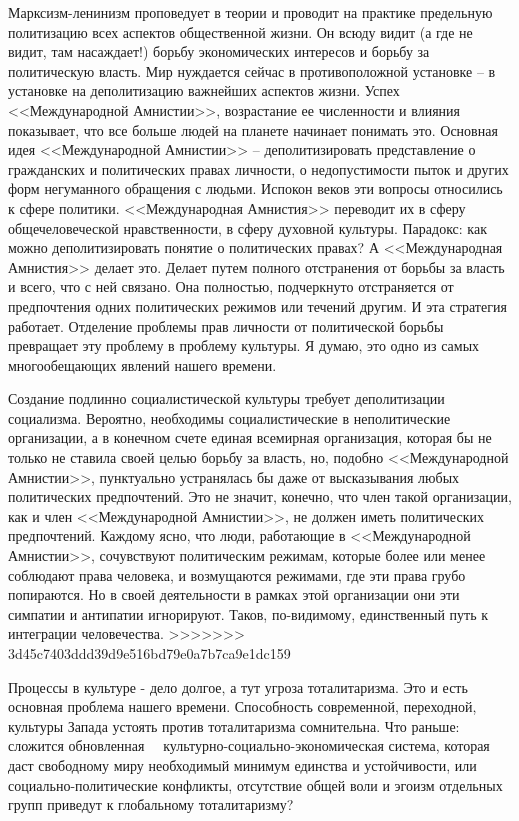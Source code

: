 \documentclass{book}
\begin{document}
{Марксизм-ленинизм проповедует в теории и проводит на практике предельную политизацию всех аспектов обществен­ной жизни. Он всюду видит (а где не видит, там насаждает!) борьбу экономических интересов и борьбу за политическую власть. Мир нуждается сейчас в противоположной установке -- в установке на деполитизацию  важнейших аспектов жизни. Успех <<Международной Амнистии>>, возрастание ее численно­сти и влияния показывает, что все больше людей на планете начи­нает понимать это. Основная идея <<Международной Амнистии>> -- деполитизировать представление о гражданских и поли­тических правах личности, о недопустимости пыток и других форм негуманного обращения с людьми. Испокон веков эти вопросы относились к сфере политики. <<Международная Амни­стия>> переводит их в сферу общечеловеческой нравственности, в сферу духовной культуры. Парадокс: как можно деполитизи­ровать понятие о политических  правах? А <<Международная Амнистия>> делает это. Делает путем полного отстранения от борьбы за власть  и всего, что с ней связано. 
Она полностью, подчеркнуто отстраняется от предпочтения одних политиче­ских режимов или течений другим. И эта стратегия работает. Отделение проблемы прав личности от политической борьбы превращает эту проблему в проблему культуры. Я думаю, это одно из самых многообещающих явлений нашего времени.

Создание подлинно социалистической культуры требует деполитизации социализма. Вероятно, необходимы социалисти­ческие в неполитические  организации, а в конечном счете еди­ная всемирная организация, которая бы не только не ставила своей целью борьбу за власть, но, подобно <<Международной Амнистии>>, пунктуально устранялась бы даже от высказывания любых политических предпочтений. Это не значит, конеч­но, что член такой организации, как и член <<Международной Амнистии>>, не должен иметь  политических предпочтений. Каж­дому ясно, что люди, работающие в <<Международной Амни­стии>>, сочувствуют политическим режимам, которые более или менее соблюдают права человека, и возмущаются режимами, где эти права грубо попираются. Но в своей деятельности в рам­ках этой организации они эти симпатии и антипатии игнорируют. Таков, по-видимому, единственный путь к интеграции челове­чества.
>>>>>>> 3d45c7403ddd39d9e516bd79e0a7b7ca9e1dc159

Процессы в культуре - дело долгое, а тут угроза тоталита­ризма. Это и есть основная проблема нашего времени. Способ­ность современной, переходной, культуры Запада устоять против тоталитаризма сомнительна. Что раньше: сложится обновлен­ная   культурно-социально-экономическая система, которая даст свободному миру необходимый минимум единства и ус­тойчивости, или социально-политические конфликты, отсутст­вие общей воли и эгоизм отдельных групп приведут к глобаль­ному тоталитаризму?

}
\end{document}
